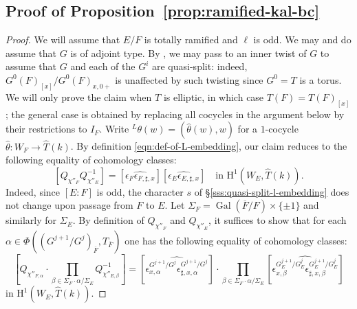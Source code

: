 \documentclass[reqno]{amsart}
\numberwithin{equation}{subsection}
\newcommand{\Gal}{\operatorname{Gal}}
\newcommand{\ol}[1]{\overline{#1}}
\newcommand{\wh}[1]{\widehat{#1}}
\newcommand{\co}{\colon}
\newcommand{\ld}{{}^L}
\newcommand{\rH}{\ensuremath{\mathrm{H}}\xspace}
\theoremstyle{remark}
\numberwithin{equation}{subsection}
\numberwithin{figure}{subsection}
\begin{document}
\subsection{Proof of Proposition~\ref{prop:ramified-kal-bc}}\label{app:ramified-bc-proof}

\begin{proof}
We will assume that $E/F$ is totally ramified and $\ell$ is odd. We may and do assume that $G$ is of adjoint type. By \cite[Lemma 6.4]{Kal21a}, we may pass to an inner twist of $G$ to assume that $G$ and each of the $G^i$ are quasi-split: indeed, $G^0(F)_{[x]}/G^0(F)_{x,0+}$ is unaffected by such twisting since $G^0 = T$ is a torus. We will only prove the claim when $T$ is elliptic, in which case $T(F) = T(F)_{[x]}$; the general case is obtained by replacing all cocycles in the argument below by their restrictions to $I_F$. Write $\ld\theta(w)=(\wh\theta(w),w)$ for a $1$-cocycle $\wh\theta\co W_F\to\wh T(k)$. By definition \eqref{eqn:def-of-L-embedding}, our claim reduces to the following equality of cohomology classes:
\begin{equation}\label{eqn:signs-cancel-0}
    [Q_{\chi''_F}Q_{\chi''_E}^{-1}] = [\wh{\epsilon_F\epsilon_{F,\sharp,x}}][\wh{\epsilon_E\epsilon_{E,\sharp,x}}] \quad\text{in }\rH^1(W_E, \wh T(k)).
\end{equation}
Indeed, since $[E:F]$ is odd, the character $s$ of \S\ref{sss:quasi-split-l-embedding} does not change upon passage from $F$ to $E$. Let $\Sigma_F = \Gal(\ol F/F) \times \{\pm 1\}$ and similarly for $\Sigma_E$. By definition of $Q_{\chi''_F}$ and $Q_{\chi''_E}$, it suffices to show that for each $\alpha \in \Phi((G^{j+1}/G^j)_{\ol F}, T_{\ol F})$ one has the following equality of cohomology classes:
\begin{equation}\label{eqn:signs-cancel-local-0}
    \left[Q_{\chi''_{F,\alpha}} \cdot \prod_{\beta \in \Sigma_F \cdot \alpha/\Sigma_E} Q_{\chi''_{E,\beta}}^{-1}\right] = \left[\wh{\epsilon_{x,\alpha}^{G^{j+1}/G^j}\epsilon_{\sharp,x,\alpha}^{G^{j+1}/G^j}}\right]\cdot \prod_{\beta \in \Sigma_F \cdot \alpha/\Sigma_E}\left[\wh{\epsilon_{x,\beta}^{G^{j+1}_E/G^j_E}\epsilon_{\sharp,x,\beta}^{G^{j+1}_E/G^j_E}}\right]
\end{equation}
in $\rH^1(W_E, \wh T(k))$.


\end{proof}
\end{document}
